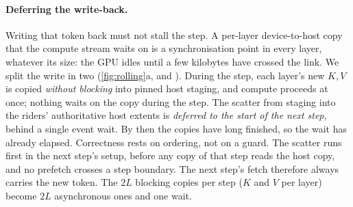 \paragraph{Deferring the write-back.} Writing that token back must not stall the
step. A per-layer device-to-host copy that the compute stream waits on is a
synchronisation point in every layer, whatever its size: the GPU idles until a
few kilobytes have crossed the link. We split the write in two
(\cref{fig:rolling}a,  and ). During the step, each layer's new $K,V$ is
copied \emph{without blocking} into pinned host staging, and compute proceeds
at once; nothing waits on the copy during the step. The scatter from staging into the riders'
authoritative host extents is \emph{deferred to the start of the next step},
behind a single event wait. By then the copies have long finished, so the wait
has already elapsed. Correctness rests on ordering, not on a guard. The scatter
runs first in the next step's setup, before any copy of that step reads the host
copy, and no prefetch crosses a step boundary. The next step's fetch therefore
always carries the new token. The $2L$ blocking copies per step ($K$ and $V$ per
layer) become $2L$ asynchronous ones and one wait.

